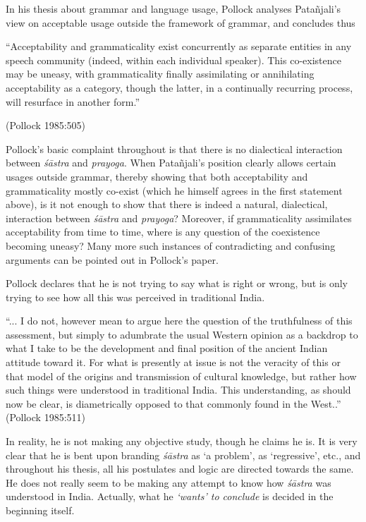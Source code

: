 In his thesis about grammar and language usage, Pollock analyses Patañjali’s view on acceptable usage outside the framework of grammar, and concludes thus
\begin{myquote}
``Acceptability and grammaticality exist concurrently as separate entities in any speech community (indeed, within each individual speaker). This co-existence may be uneasy, with grammaticality finally assimilating or annihilating acceptability as a category, though the latter, in a continually recurring process, will resurface in another form.'' 

\hfill (Pollock 1985:505)
\end{myquote}

Pollock's basic complaint throughout is that there is no dialectical interaction between {\it śāstra} and {\it prayoga}. When Patañjali’s position clearly allows certain usages outside grammar, thereby showing that both acceptability and grammaticality mostly co-exist (which he himself agrees in the first statement above), is it not enough to show that there is indeed a natural, dialectical, interaction between {\it śāstra} and {\it prayoga}? Moreover, if grammaticality assimilates acceptability from time to time, where is any question of the coexistence becoming uneasy? Many more such instances of contradicting and confusing arguments can be pointed out in Pollock's paper.

Pollock declares that he is not trying to say what is right or wrong, but is only trying to see how all this was perceived in traditional India. 
\begin{myquote}
``... I do not, however mean to argue here the question of the truthfulness of this assessment, but simply to adumbrate the usual Western opinion as a backdrop to what I take to be the development and final position of the ancient Indian attitude toward it. For what is presently at issue is not the veracity of this or that model of the origins and transmission of cultural knowledge, but rather how such things were understood in traditional India. This understanding, as should now be clear, is diametrically opposed to that commonly found in the West..'' \hfill (Pollock 1985:511)
\end{myquote}

In reality, he is not making any objective study, though he claims he is. It is very clear that he is bent upon branding {\it śāstra} as `a problem', as `regressive', etc., and throughout his thesis, all his postulates  and logic are directed towards the same. He does not really seem to be making any attempt to know how {\it śāstra} was understood in India. Actually, what he \textsl{`wants' to conclude} is decided in the beginning itself. 

